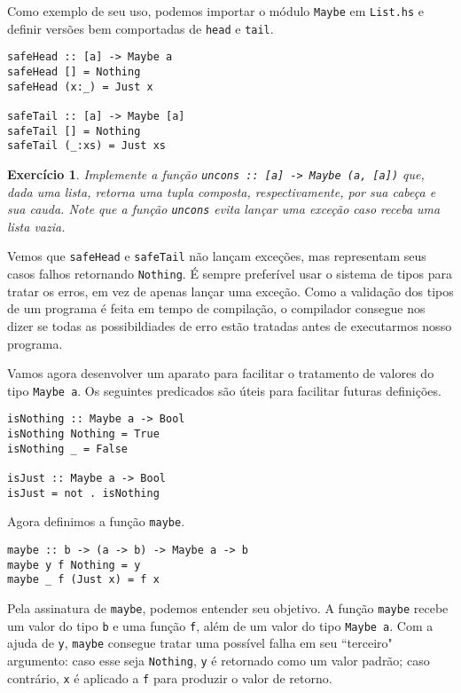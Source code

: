 \documentclass[a4paper]{article}
\newtheorem{exercicio}{Exercício}
\begin{document}
Como exemplo de seu uso, podemos importar o módulo \texttt{Maybe} em \texttt{List.hs} e definir versões bem comportadas de \texttt{head} e \texttt{tail}.

\begin{verbatim}
safeHead :: [a] -> Maybe a
safeHead [] = Nothing
safeHead (x:_) = Just x

safeTail :: [a] -> Maybe [a]
safeTail [] = Nothing
safeTail (_:xs) = Just xs
\end{verbatim}

\begin{exercicio}
	Implemente a função \emph{\texttt{uncons :: [a] -> Maybe (a, [a])}} que, dada uma lista, retorna uma tupla composta, respectivamente, por sua cabeça e sua cauda.
	Note que a função \emph{\texttt{uncons}} evita lançar uma exceção caso receba uma lista vazia.
\end{exercicio}

Vemos que \texttt{safeHead} e \texttt{safeTail} não lançam exceções, mas representam seus casos falhos retornando \texttt{Nothing}.
É sempre preferível usar o sistema de tipos para tratar os erros, em vez de apenas lançar uma exceção.
Como a validação dos tipos de um programa é feita em tempo de compilação, o compilador consegue nos dizer se todas as possibildiades de erro estão tratadas antes de executarmos nosso programa.

Vamos agora desenvolver um aparato para facilitar o tratamento de valores do tipo \texttt{Maybe a}.
Os seguintes predicados são úteis para facilitar futuras definições.

\begin{verbatim}
isNothing :: Maybe a -> Bool
isNothing Nothing = True
isNothing _ = False

isJust :: Maybe a -> Bool
isJust = not . isNothing
\end{verbatim}

Agora definimos a função \texttt{maybe}.

\begin{verbatim}
maybe :: b -> (a -> b) -> Maybe a -> b
maybe y f Nothing = y
maybe _ f (Just x) = f x
\end{verbatim}

Pela assinatura de \texttt{maybe}, podemos entender seu objetivo.
A função \texttt{maybe} recebe um valor do tipo \texttt{b} e uma função \texttt{f}, além de um valor do tipo \texttt{Maybe a}.
Com a ajuda de \texttt{y}, \texttt{maybe} consegue tratar uma possível falha em seu ``terceiro" argumento: caso esse seja \texttt{Nothing}, \texttt{y} é retornado como um valor padrão; caso contrário, \texttt{x} é aplicado a \texttt{f} para produzir o valor de retorno.
\end{document}
